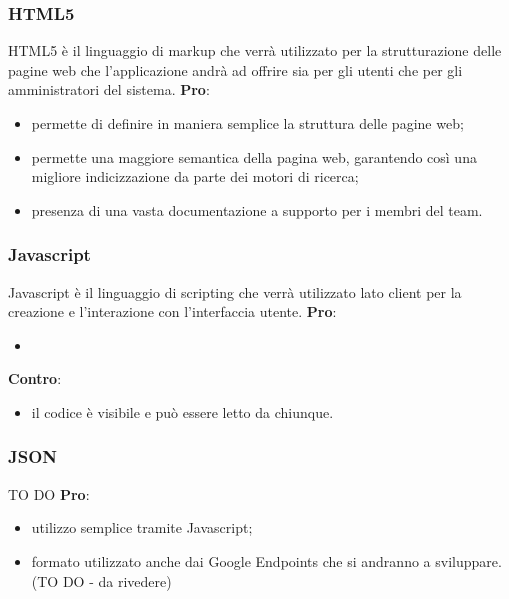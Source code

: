 		\subsubsection{HTML5} %
		\label{ssub:html}
		HTML5 è il linguaggio di markup che verrà utilizzato per la strutturazione delle pagine web che l'applicazione andrà ad offrire sia per gli utenti che per gli amministratori del sistema. \newline
		\textbf{Pro}:
			\begin{itemize}
				\item permette di definire in maniera semplice la struttura delle pagine web;
				\item permette una maggiore semantica della pagina web, garantendo così una migliore indicizzazione da parte dei motori di ricerca;
				\item presenza di una vasta documentazione a supporto per i membri del team.
			\end{itemize}
			\noindent

		\subsubsection{Javascript} %
		\label{ssub:javascript}
		Javascript è il linguaggio di scripting che verrà utilizzato lato client per la creazione e l'interazione con l'interfaccia utente. \newline
		\textbf{Pro}:
			\begin{itemize}
				\item 
			\end{itemize}
		\noindent
		\newline
		\textbf{Contro}:
			\begin{itemize}
				\item il codice è visibile e può essere letto da chiunque.
			\end{itemize}
			\noindent

		\subsubsection{JSON} %
		\label{ssub:json}
		TO DO \newline
		\textbf{Pro}:
			\begin{itemize}
				\item utilizzo semplice tramite Javascript;
				\item formato utilizzato anche dai Google Endpoints che si andranno a sviluppare. (TO DO - da rivedere)
			\end{itemize}
			\noindent

